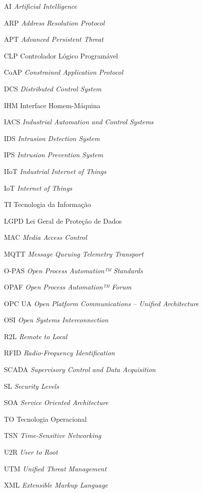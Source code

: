 \begin{siglas}
    \item[AI] \textit{Artificial Intelligence}
    \item[ARP] \textit{Address Resolution Protocol}
    \item[APT] \textit{Advanced Persistent Threat}
    \item[CLP] Controlador Lógico Programável
    \item[CoAP] \textit{Constrained Application Protocol}
    \item[DCS] \textit{Distributed Control System}
    \item[IHM] Interface Homem-Máquina
    \item[IACS] \textit{Industrial Automation and Control Systems}
    \item[IDS] \textit{Intrusion Detection System}
    \item[IPS] \textit{Intrusion Prevention System}
    \item[IIoT] \textit{Industrial Internet of Things}
    \item[IoT] \textit{Internet of Things}
    \item[TI] Tecnologia da Informação
    \item[LGPD] Lei Geral de Proteção de Dados
    \item[MAC] \textit{Media Access Control}
    \item[MQTT] \textit{Message Queuing Telemetry Transport}
    \item[O-PAS] \textit{Open Process Automation™ Standards}
    \item[OPAF] \textit{Open Process Automation™ Forum}
    \item[OPC UA] \textit{Open Platform Communications – Unified Architecture}
    \item[OSI] \textit{Open Systems Interconnection}
    \item[R2L] \textit{Remote to Local}
    \item[RFID] \textit{Radio-Frequency Identification}
    \item[SCADA] \textit{Supervisory Control and Data Acquisition}
    \item[SL] \textit{Security Levels}
    \item[SOA] \textit{Service Oriented Architecture}
    \item[TO] Tecnologia Operacional
    \item[TSN] \textit{Time-Sensitive Networking}
    \item[U2R] \textit{User to Root}
    \item[UTM] \textit{Unified Threat Management}
    \item[XML] \textit{Extensible Markup Language}
\end{siglas}
